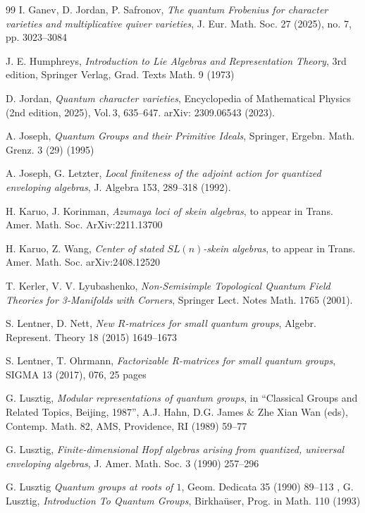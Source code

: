 \documentclass[11pt]{amsart}
\begin{document}
\begin{thebibliography}{99}
 I. Ganev, D. Jordan, P. Safronov, {\it The quantum Frobenius for character varieties and multiplicative quiver varieties},  J. Eur. Math. Soc. 27 (2025), no. 7, pp. 3023--3084

 J. E. Humphreys, {\it Introduction to Lie Algebras and Representation Theory}, 3rd edition, Springer Verlag, Grad. Texts Math. 9 (1973) 

 D. Jordan, {\em Quantum character varieties}, Encyclopedia of Mathematical Physics (2nd edition, 2025), Vol.\,3, 635--647. arXiv: 2309.06543 (2023).

 A. Joseph, {\it Quantum Groups and their Primitive Ideals}, Springer, Ergebn. Math. Grenz. 3 (29) (1995)

 A. Joseph, G. Letzter, {\em Local finiteness of the adjoint action for quantized enveloping algebras}, J. Algebra 153, 289--318 (1992).

 H. Karuo, J. Korinman, {\it Azumaya loci of skein algebras}, to appear in Trans. Amer. Math. Soc. ArXiv:2211.13700

 H. Karuo, Z. Wang, {\it Center of stated $SL(n)$-skein algebras}, to appear in Trans. Amer. Math. Soc. arXiv:2408.12520

 T. Kerler, V. V. Lyubashenko, {\it Non-Semisimple Topological Quantum Field Theories for 3-Manifolds with Corners}, Springer Lect. Notes Math. 1765 (2001).

 S. Lentner, D. Nett, {\it New $R$-matrices for small quantum groups}, Algebr. Represent. Theory 18 (2015) 1649--1673 

 S. Lentner, T. Ohrmann, {\it Factorizable R-matrices for small quantum groups}, SIGMA 13 (2017), 076, 25 pages

 G. Lusztig, {\it Modular representations of quantum groups}, in ``Classical Groups and Related Topics, Beijing, 1987'', A.J. Hahn, D.G. James $\&$ Zhe Xian Wan (eds), Contemp. Math. 82, AMS, Providence, RI (1989) 59--77

 G. Lusztig, {\it Finite-dimensional Hopf algebras arising from quantized, universal enveloping algebras}, J. Amer. Math. Soc. 3 (1990) 257--296 

 G. Lusztig {\it Quantum groups at roots of $1$}, Geom. Dedicata 35 (1990) 89--113
,
 G. Lusztig, {\it Introduction To Quantum Groups}, Birkha\"user, Prog. in Math. 110 (1993) 


\end{thebibliography}
\end{document}
